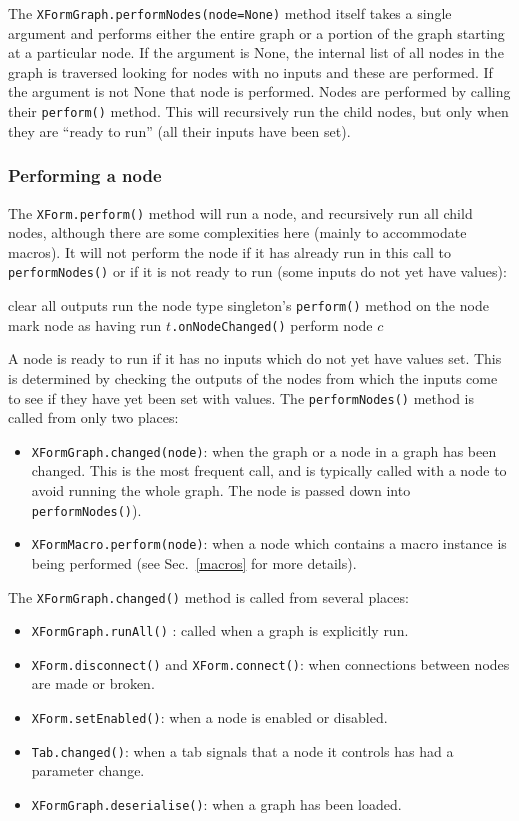 The \texttt{XFormGraph.performNodes(node=None)} method itself takes a single
argument and performs either the entire graph or a portion of the graph
starting at a particular node. If the argument is None, the internal list of
all nodes in the graph is traversed looking for nodes with no inputs and these
are performed. If the argument is not None that node is performed. Nodes are
performed by calling their \texttt{perform()} method. This will recursively
run the child nodes, but only when they are ``ready to run'' (all their inputs
have been set). 

\clearpage
\subsubsection{Performing a node}
The \texttt{XForm.perform()} method will run a node, and recursively run all child nodes, although
there are some complexities here (mainly to accommodate macros). It will not perform the node if it 
has already run in this call to \texttt{performNodes()} or if it is not ready to run (some inputs do not yet have values):
\begin{algorithmic}
\STATE clear all outputs
\STATE run the node type singleton's \texttt{perform()} method on the node
\STATE mark node as having run
\STATE $t$\texttt{.onNodeChanged()}
\ENDFOR
{}
\STATE perform node $c$
\ENDFOR
\ENDIF
\end{algorithmic}
A node is ready to run if it has no inputs which do not yet have values set. This is
determined by checking the outputs of the nodes from which the inputs come to see if
they have yet been set with values. The \texttt{performNodes()} method is called from only two places:
\begin{itemize}
\item \texttt{XFormGraph.changed(node)}: when the graph or a node in a graph has been changed. This is the most
frequent call, and is typically called with a node to avoid running the whole graph. The node is passed down into
\texttt{performNodes()}).
\item \texttt{XFormMacro.perform(node)}: when a node which contains a macro instance is being performed (see
Sec.~\ref{macros} for more details).
\end{itemize}
The \texttt{XFormGraph.changed()} method is called from several places:
\begin{itemize}
\item \texttt{XFormGraph.runAll()} : called when a graph is explicitly run.
\item \texttt{XForm.disconnect()} and \texttt{XForm.connect()}: when connections between nodes are made or broken.
\item \texttt{XForm.setEnabled()}: when a node is enabled or disabled.
\item \texttt{Tab.changed()}: when a tab signals that a node it controls has had a parameter change.
\item \texttt{XFormGraph.deserialise()}: when a graph has been loaded.
\end{itemize}

